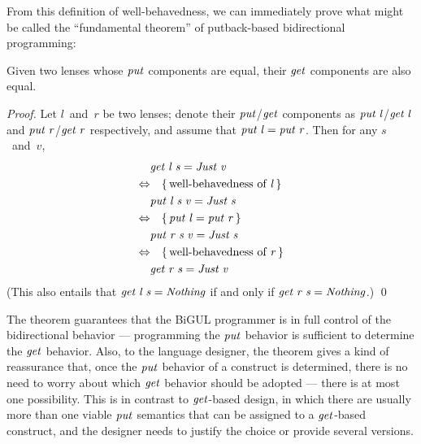From this definition of well-behavedness, we can immediately prove what might be called the ``fundamental theorem'' of putback-based bidirectional programming:
\begin{theorem} \label{thm:uniqueness}
Given two lenses whose \ensuremath{\Varid{put}} components are equal, their \ensuremath{\Varid{get}} components are also equal.
\end{theorem}
\begin{proof}
Let $l$~and~$r$ be two lenses; denote their \ensuremath{\Varid{put}}/\ensuremath{\Varid{get}} components as \ensuremath{\Varid{put}\;\Varid{l}}/\ensuremath{\Varid{get}\;\Varid{l}} and \ensuremath{\Varid{put}\;\Varid{r}}/\ensuremath{\Varid{get}\;\Varid{r}} respectively, and assume that $\mathit{put}\;\mathit{l} = \mathit{put}\;\mathit{r}$.
Then for any $s$~and~$v$,
\begin{align*}
& \mathit{get}\;\mathit{l}\;\mathit{s} = \mathit{Just}\;\mathit{v} \\
\Leftrightarrow& \quad\{\,\text{well-behavedness of~\ensuremath{\mathit{l}}}\,\} \\
& \mathit{put}\;\mathit{l}\;\mathit{s}\;\mathit{v} = \mathit{Just}\;\mathit{s} \\
\Leftrightarrow& \quad\{\,\text{$\mathit{put}\;\mathit{l} = \mathit{put}\;\mathit{r}$}\,\} \\
& \mathit{put}\;\mathit{r}\;\mathit{s}\;\mathit{v} = \mathit{Just}\;\mathit{s} \\
\Leftrightarrow& \quad\{\,\text{well-behavedness of~\ensuremath{\mathit{r}}}\,\} \\
& \mathit{get}\;\mathit{r}\;\mathit{s} = \mathit{Just}\;\mathit{v}
\end{align*}
(This also entails that $\mathit{get}\;\mathit{l}\;\mathit{s} = \mathit{Nothing}$ if and only if $\mathit{get}\;\mathit{r}\;\mathit{s} = \mathit{Nothing}$.) \qed
\end{proof}
The theorem guarantees that the BiGUL programmer is in full control of the bidirectional behavior --- programming the \ensuremath{\Varid{put}} behavior is sufficient to determine the \ensuremath{\Varid{get}} behavior.
Also, to the language designer, the theorem gives a kind of reassurance that, once the \ensuremath{\Varid{put}} behavior of a construct is determined, there is no need to worry about which \ensuremath{\Varid{get}} behavior should be adopted --- there is at most one possibility.
This is in contrast to \ensuremath{\Varid{get}}-based design, in which there are usually more than one viable \ensuremath{\Varid{put}} semantics that can be assigned to a \ensuremath{\Varid{get}}-based construct, and the designer needs to justify the choice or provide several versions.

